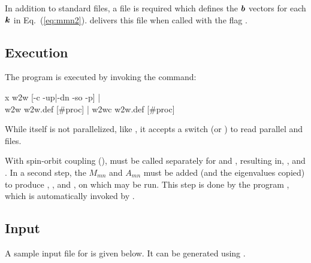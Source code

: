 In addition to standard \wien files, a file  is
required which defines the ${\boldsymbol b}$ vectors for each ${\boldsymbol k}$ in
Eq.~(\ref{eq:mmn2}).  \wannierx delivers this file when called with
the flag .

\subsection{Execution}

The program \wiiw is executed by invoking the command:
%
\begin{usage}
  x w2w [-c -up|-dn -so -p] |
  \\
  w2w w2w.def [\#proc]
  |
  w2wc w2w.def [\#proc]
\end{usage}

While \wiiw itself is not parallelized, like , it
accepts a  switch (or ) to read parallel
 and  files.

With spin-orbit coupling (), \wiiw must be called separately
for  and , resulting in\linebreak[4]
, , and
.  In a second step, the $M_{mn}$ and
$A_{mn}$ must be added (and the eigenvalues copied) to produce
, , and , on which
\wannier may be run.  This step is done by the program \wiiwaddsp,
which is automatically invoked by .


\subsection{Input}

A sample input file for \wtow is given below. It can be generated
using \writeinwf.
%
%
\listnote

